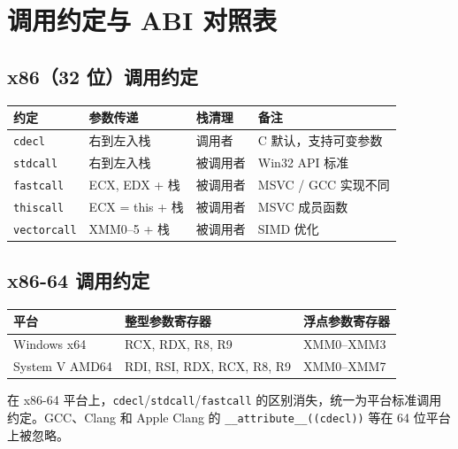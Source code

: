 \documentclass[12pt,a4paper,fontset=fandol]{ctexbook}
\begin{document}
\appendix
\chapter{调用约定与 ABI 对照表}

\section*{x86（32 位）调用约定}

\begin{longtable}{lp{3cm}p{3cm}p{3.5cm}}
\toprule
\textbf{约定} & \textbf{参数传递} & \textbf{栈清理} & \textbf{备注} \\
\midrule
\texttt{cdecl}     & 右到左入栈     & 调用者          & C 默认，支持可变参数 \\
\texttt{stdcall}   & 右到左入栈     & 被调用者        & Win32 API 标准 \\
\texttt{fastcall}  & ECX, EDX + 栈 & 被调用者        & MSVC / GCC 实现不同 \\
\texttt{thiscall}  & ECX = this + 栈 & 被调用者       & MSVC 成员函数 \\
\texttt{vectorcall} & XMM0--5 + 栈 & 被调用者        & SIMD 优化 \\
\bottomrule
\end{longtable}

\section*{x86-64 调用约定}

\begin{longtable}{l>{\raggedright\arraybackslash}p{4cm}>{\raggedright\arraybackslash}p{5cm}}
\toprule
\textbf{平台} & \textbf{整型参数寄存器} & \textbf{浮点参数寄存器} \\
\midrule
Windows x64   & RCX, RDX, R8, R9       & XMM0--XMM3 \\
System V AMD64 & RDI, RSI, RDX, RCX, R8, R9 & XMM0--XMM7 \\
\bottomrule
\end{longtable}

在 x86-64 平台上，\texttt{cdecl}/\allowbreak{}\texttt{stdcall}/\allowbreak{}\texttt{fastcall} 的区别消失，统一为平台标准调用约定。GCC、Clang 和 Apple Clang 的 \texttt{\_\_attribute\_\_((cdecl))} 等在 64 位平台上被忽略。
\end{document}

